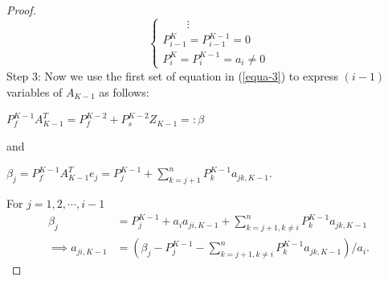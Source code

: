 \documentclass[10pt]{amsart}
\theoremstyle{remark}
\begin{document}
\begin{proof}
\begin{equation}
\begin{cases}
    \quad \quad \, \vdots \\
      P^K_{i-1}= P^{K-1}_{i-1} =  0\\
      P^K_i = P^{K-1}_{i} = a_i \neq 0
\end{cases}
\end{equation}
Step 3: Now we use the first set of equation in (\ref{equa-3}) to express $(i-1)$ variables of $A_{K-1}$ as follows:
\begin{center}
    $P^{K-1}_f A^T_{K-1} = P^{K-2}_f+P^{K-2}_s Z_{K-1} =:  \beta$
\end{center}
and
\begin{center}
    $\beta_j =  P^{K-1}_f A^T_{K-1} e_j = P^{K-1}_j + \sum^n_{k=j+1} P^{K-1}_k a_{jk,K-1}$.
\end{center}
For $j =  1,2,\cdots,i-1$
\begin{align*}
    \beta_j &= P^{K-1}_j + a_i a_{ji, K-1} + \sum^n_{k=j+1, k \neq i} P^{K-1}_k a_{jk,K-1} \\
    \implies a_{ji,K-1}  &= (\beta_j-P^{K-1}_j-\sum^n_{k=j+1,k \neq i}P^{K-1}_ka_{jk,K-1})/a_i.
\end{align*}
\end{proof}
\end{document}
